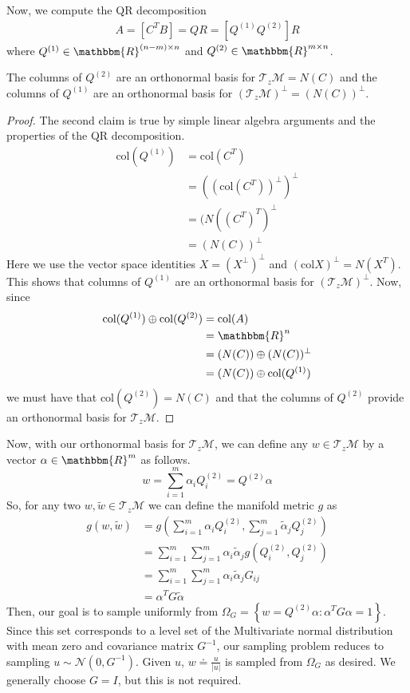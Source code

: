 Now, we compute the QR decomposition 
\begin{align}
        A = \left[C^T B\right] = QR = \left[Q^{(1)} Q^{(2)}\right] R
\end{align}
where $Q^{(1)} \in \mathbbm{R}^{(n-m)\times n}$ and $ Q^{(2)} \in \mathbbm{R}^{m\times n}$.
\begin{mythm}
The columns of $Q^{(2)}$ are an orthonormal basis for $\mathcal{T}_z\mathcal{M} = N(C)$ and the columns of $Q^{(1)}$ are an orthonormal basis for $(\mathcal{T}_z\mathcal{M})^\perp = (N(C))^\perp$.
\end{mythm}
\begin{proof}
The second claim is true by simple linear algebra arguments and the properties of the QR decomposition.
\begin{align}
        \text{col} (Q^{(1)}) &= \text{col}(C^T)\\
        &= ((\text{col}(C^T))^\perp)^\perp\\
        &= (N((C^T)^T)^\perp \\ 
        &= (N(C))^\perp
\end{align}
Here we use the vector space identities $X = (X^\perp)^\perp$ and $(\text{col} X)^\perp = N(X^T)$. This shows that columns of $Q^{(1)}$ are an orthonormal basis for $(\mathcal{T}_z\mathcal{M})^\perp$. Now, since 
\begin{align}
        \text{col} (Q^{(1)}) \oplus \text{col} (Q^{(2)}) &= \text{col}(A) \\
        &= \mathbbm{R}^n \\
        & = (N(C)) \oplus (N(C))^\perp \\
        & = (N(C)) \oplus \text{col} (Q^{(1)})
\end{align}
 we must have that $\text{col}(Q^{(2)}) = N(C)$ and that the columns of $Q^{(2)}$ provide an orthonormal basis for $\mathcal{T}_z\mathcal{M}$.
\end{proof}
Now, with our orthonormal basis for $\mathcal{T}_z\mathcal{M}$, we can define any $w \in \mathcal{T}_z\mathcal{M}$ by a vector $\alpha \in\mathbbm{R}^m$ as follows.
$$w = \sum_{i=1}^m \alpha_iQ^{(2)}_i = Q^{(2)}\alpha$$
So, for any two $w,\tilde{w} \in \mathcal{T}_z\mathcal{M}$ we can define the manifold metric $g$ as
\begin{align}
        g(w,\tilde{w}) &= g\left(\sum_{i=1}^m \alpha_iQ^{(2)}_i, \sum_{j=1}^m \tilde{\alpha}_jQ^{(2)}_j\right) \\
        &= \sum_{i=1}^m\sum_{j=1}^m  \alpha_i \tilde{\alpha}_j g\left(Q^{(2)}_i, Q^{(2)}_j\right) \\
        &= \sum_{i=1}^m\sum_{j=1}^m  \alpha_i \tilde{\alpha}_j G_{ij} \\
        &= \alpha^T  G\tilde{\alpha}
\end{align}
Then, our goal is to sample uniformly from $\Omega_G = \left\{w = Q^{(2)}\alpha : \alpha^T G\alpha = 1\right\}$. Since this set corresponds to a level set of the Multivariate normal distribution with mean zero and covariance matrix $G^{-1}$, our sampling problem reduces to sampling $u \sim \mathcal{N}(0,G^{-1})$. Given $u$, $w \doteq \frac{u}{|u|}$ is sampled from $\Omega_G$ as desired. We generally choose $G = I$, but this is not required. 

